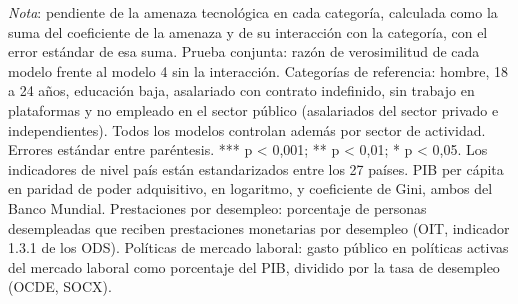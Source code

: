 \documentclass[
  spanish,
  12pt,
]{article}
\begin{document}
\emph{Nota}: pendiente de la amenaza tecnológica en cada categoría,
calculada como la suma del coeficiente de la amenaza y de su interacción
con la categoría, con el error estándar de esa suma. Prueba conjunta:
razón de verosimilitud de cada modelo frente al modelo 4 sin la
interacción. Categorías de referencia: hombre, 18 a 24 años, educación
baja, asalariado con contrato indefinido, sin trabajo en plataformas y
no empleado en el sector público (asalariados del sector privado e
independientes). Todos los modelos controlan además por sector de
actividad. Errores estándar entre paréntesis. *** p \textless{} 0,001;
** p \textless{} 0,01; * p \textless{} 0,05. Los indicadores de nivel
país están estandarizados entre los 27 países. PIB per cápita en paridad
de poder adquisitivo, en logaritmo, y coeficiente de Gini, ambos del
Banco Mundial. Prestaciones por desempleo: porcentaje de personas
desempleadas que reciben prestaciones monetarias por desempleo (OIT,
indicador 1.3.1 de los ODS). Políticas de mercado laboral: gasto público
en políticas activas del mercado laboral como porcentaje del PIB,
dividido por la tasa de desempleo (OCDE, SOCX).
\end{document}
